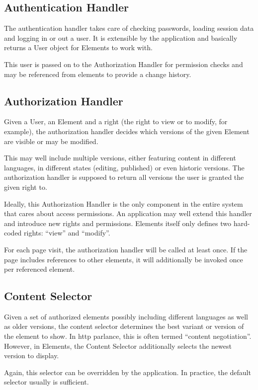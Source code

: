\documentclass[table]{scrartcl}
\begin{document}
\subsection{Authentication Handler}
The authentication handler takes care of checking passwords, loading
session data and logging in or out a user. It is extensible by the
application and basically returns a User object for Elements to work
with.

This user is passed on to the Authorization Handler for permission
checks and may be referenced from elements to provide a change
history.

\subsection{Authorization Handler}
Given a User, an Element and a right (the right to view or to modify,
for example), the authorization handler decides which versions of the
given Element are visible or may be modified.

This may well include multiple versions, either featuring content in
different languages, in different states (editing, published) or even
historic versions. The authorization handler is supposed to return all
versions the user is granted the given right to.

Ideally, this Authorization Handler is the only component in the
entire system that cares about access permissions. An application may
well extend this handler and introduce new rights and
permissions. Elements itself only defines two hard-coded rights:
``view'' and ``modify''.

For each page visit, the authorization handler will be called at least
once. If the page includes references to other elements, it will
additionally be invoked once per referenced element.

\subsection{Content Selector}
Given a set of authorized elements possibly including different
languages as well as older versions, the content selector determines
the best variant or version of the element to show. In \ac{http}
parlance, this is often termed ``content negotiation''. However, in
Elements, the Content Selector additionally selects the newest
version to display.

Again, this selector can be overridden by the application. In
practice, the default selector usually is sufficient.
\end{document}

